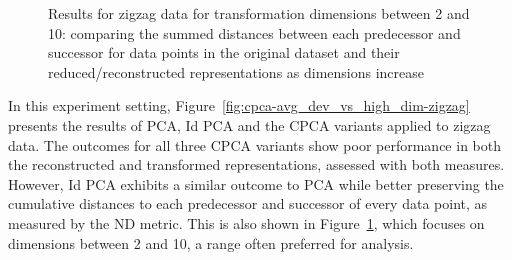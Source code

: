 \documentclass[pdftex,12pt,a4paper]{report}
\begin{document}
\begin{figure}
    \caption{Results for zigzag data for transformation dimensions between 2 and 10: comparing the summed distances between each predecessor and successor for data points in the original dataset and their reduced/reconstructed representations as dimensions increase} \label{fig:cpca-avg_dev_vs_high_dim-cut-zigzag}
\end{figure}

In this experiment setting, Figure~\ref{fig:cpca-avg_dev_vs_high_dim-zigzag} presents the results of PCA, Id PCA and the CPCA variants applied to zigzag data.
The outcomes for all three CPCA variants show poor performance in both the reconstructed and transformed representations, assessed with both measures. 
However, Id PCA exhibits a similar outcome to PCA while better preserving the cumulative distances to each predecessor and successor of every data point, as measured by the ND metric.
This is also shown in Figure~\ref{fig:cpca-avg_dev_vs_high_dim-cut-zigzag}, which focuses on dimensions between 2 and 10, a range often preferred for analysis.
\end{document}
